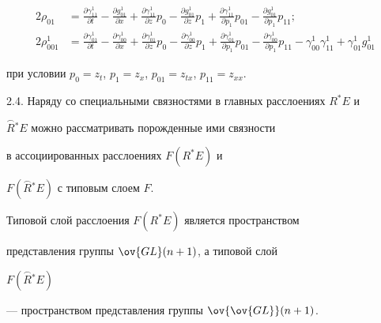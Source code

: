 \begin{equation}


\begin{split}


2\rho_{01}&=\frac{{\partial \gamma_{11}^1}}{{\partial t}}-


\frac{{\partial} g_{01}^1}{{\partial x}}+


\frac{{\partial \gamma_{11}^1}}{{\partial z}}p_0-


\frac{{\partial g_{01}^1}}{{\partial z}}p_1+


\frac{{\partial \gamma_{11}^1}}{{\partial p_1}}p_{01}-


\frac{{\partial g_{01}^1}}{{\partial p_1}}p_{11} ;\\


2\rho_{001}^1&=\frac{{\partial \gamma_{01}^1}}{{\partial t}}-


\frac{{\partial \gamma_{00}^1}}{{\partial x}}+


\frac{{\partial \gamma_{01}^1}}{{\partial z}}p_0-


\frac{{\partial \gamma_{00}^1}}{{\partial z}}p_1+


\frac{{\partial \gamma_{01}^1}}{{\partial p_1}}p_{01}-


\frac{{\partial \gamma_{00}^1}}{{\partial p_1}}p_{11}-


\gamma_{00}^1 \gamma_{11}^1+\gamma_{01}^1 g_{01}^1


\end{split} 


\end{equation}


при условии $p_0=z_t$, $p_1=z_x$, $p_{01}=z_{tx}$, $p_{11}=z_{xx}$.


\medskip





2.4. Наряду со специальными связностями в главных расслоениях $R^*E$ и


$\overset{\frown}{R}{}^*E$ можно рассматривать порожденные ими связности 


в ассоциированных расслоениях $F(R^*E)$ и


$F(\overset{\frown}{R}{}^*E)$ с типовым слоем $F$.


Типовой слой расслоения $F ({R^ * E})$ является пространством 


представления группы $\ov {GL} ({n+1})$, а типовой слой


$F(\overset{\frown}{R}{}^ * E)$


--- пространством представления группы $\ov{\ov {GL}} ({n+1})$.


